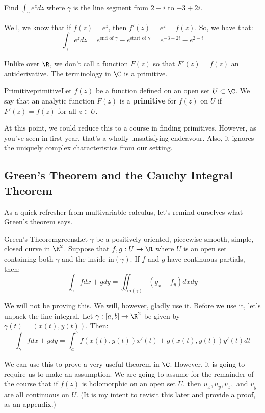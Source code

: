 \begin{ex}{}{} Find $\int_\gamma e^zdz$ where $\gamma$ is the line segment from $2 - i$ to $-3 + 2i$.

Well, we know that if $f(z) = e^z$, then $f'(z) = e^z = f(z)$. So, we have that:
$$\int_{\gamma} e^zdz = e^{\text{end of }\gamma} - e^{\text{start of }\gamma} = e^{-3 + 2i} - e^{2 - i}$$
\end{ex}

Unlike over $\R$, we don't call a function $F(z)$ so that $F'(z) = f(z)$ an antiderivative. The terminology in $\C$ is a primitive.

\begin{defbo}{Primitive}{primitive}Let $f(z)$ be a function defined on an open set $U \subset \C$. We say that an analytic function $F(z)$ is a {\bf primitive} for $f(z)$ on $U$ if $F'(z) = f(z)$ for all $z\in U$.
\end{defbo}

At this point, we could reduce this to a course in finding primitives. However, as you've seen in first year, that's a wholly unsatisfying endeavour. Also, it ignores the uniquely complex characteristics from our setting.

\subsection{Green's Theorem and the Cauchy Integral Theorem}

As a quick refresher from multivariable calculus, let's remind ourselves what Green's theorem says.

\begin{thmbo}{Green's Theorem}{greens}Let $\gamma$ be a positively oriented, piecewise smooth, simple, closed curve in $\R^2$. Suppose that $f,g:U\rightarrow \R$ where $U$ is an open set containing both $\gamma$ and the inside $\mathrm{in}(\gamma)$. If $f$ and $g$ have continuous partials, then:
$$\int_{\gamma} fdx + gdy = \iint_{\mathrm{in}(\gamma)} (g_x - f_y)dxdy$$
\end{thmbo}

We will not be proving this. We will, however, gladly use it. Before we use it, let's unpack the line integral. Let $\gamma:[a,b] \rightarrow \R^2$ be given by $\gamma(t) = (x(t),y(t))$. Then:
$$\int_{\gamma} fdx + gdy = \int_a^b f(x(t),y(t))x'(t) + g(x(t),y(t))y'(t)dt$$

We can use this to prove a very useful theorem in $\C$. However, it is going to require us to make an assumption. We are going to assume for the remainder of the course that if $f(z)$ is holomorphic on an open set $U$, then $u_x,u_y,v_x,$ and $v_y$ are all continuous on $U$. (It is my intent to revisit this later and provide a proof, as an appendix.)

